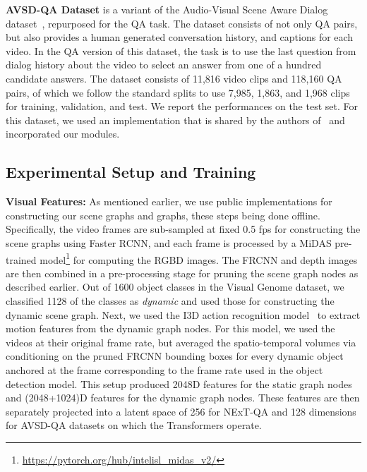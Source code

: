 \documentclass[letterpaper]{article}
\begin{document}
\noindent\textbf{AVSD-QA Dataset} is a variant of the Audio-Visual Scene Aware Dialog dataset~\cite{AVSD@DSTC7}, repurposed for the QA task. The dataset consists of not only QA pairs, but also provides a human generated conversation history, and  captions for each video. In the QA version of this dataset, the task is to use the last question from dialog history about the video to select an answer from one of a hundred candidate answers. The dataset consists of 11,816 video clips and 118,160 QA pairs, of which we follow the standard splits to use 7,985, 1,863, and 1,968 clips for training, validation, and test. We report the performances on the test set. For this dataset, we used an implementation that is shared by the authors of~\cite{geng2021dynamic} and incorporated our modules.

\subsection{Experimental Setup and Training}
\noindent\textbf{Visual Features:} As mentioned earlier, we use public implementations for constructing our scene graphs and \name graphs, these steps being done offline. Specifically, the video frames are sub-sampled at fixed 0.5 fps for constructing the scene graphs using Faster RCNN, and each frame is processed by a MiDAS pre-trained model\footnote{\url{https://pytorch.org/hub/intelisl_midas_v2/}} for computing the RGBD images. The FRCNN and depth images are then combined in a pre-processing stage for pruning the scene graph nodes as described earlier. Out of 1600 object classes in the Visual Genome dataset, we classified 1128 of the classes as \emph{dynamic} and used those for constructing the dynamic scene graph. Next, we used the I3D action recognition model~\cite{carreira2017quo} to extract motion features from the dynamic graph nodes. For this model, we used the videos at their original frame rate, but averaged the spatio-temporal volumes via conditioning on the pruned FRCNN bounding boxes for every dynamic object anchored at the frame corresponding to the frame rate used in the object detection model. This setup produced 2048D features for the static graph nodes and (2048+1024)D features for the dynamic graph nodes. These features are then separately projected into a latent space of 256 for NExT-QA and 128 dimensions for AVSD-QA datasets on which the Transformers operate.
\end{document}
